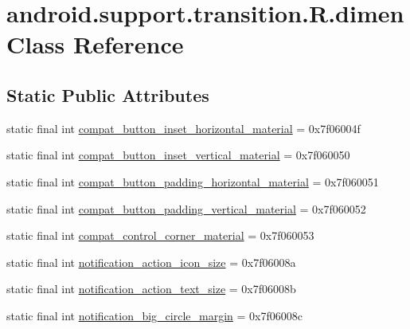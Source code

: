 \hypertarget{classandroid_1_1support_1_1transition_1_1R_1_1dimen}{}\section{android.\+support.\+transition.\+R.\+dimen Class Reference}
\label{classandroid_1_1support_1_1transition_1_1R_1_1dimen}
\subsection*{Static Public Attributes}
\begin{DoxyCompactItemize}
\item 
static final int \mbox{\hyperlink{classandroid_1_1support_1_1transition_1_1R_1_1dimen_ad48c30c57f147b3c4862710beca8e4da}{compat\+\_\+button\+\_\+inset\+\_\+horizontal\+\_\+material}} = 0x7f06004f
\item 
static final int \mbox{\hyperlink{classandroid_1_1support_1_1transition_1_1R_1_1dimen_a6df64291afb714b8eef79ccb2d3d903a}{compat\+\_\+button\+\_\+inset\+\_\+vertical\+\_\+material}} = 0x7f060050
\item 
static final int \mbox{\hyperlink{classandroid_1_1support_1_1transition_1_1R_1_1dimen_ac3103c3e23c6252fdf914a61c1bbb9a2}{compat\+\_\+button\+\_\+padding\+\_\+horizontal\+\_\+material}} = 0x7f060051
\item 
static final int \mbox{\hyperlink{classandroid_1_1support_1_1transition_1_1R_1_1dimen_a88db3cd5630edb0d3f334347d36e9eca}{compat\+\_\+button\+\_\+padding\+\_\+vertical\+\_\+material}} = 0x7f060052
\item 
static final int \mbox{\hyperlink{classandroid_1_1support_1_1transition_1_1R_1_1dimen_aa31fe95e8483316ad69395c3e5e15ed2}{compat\+\_\+control\+\_\+corner\+\_\+material}} = 0x7f060053
\item 
static final int \mbox{\hyperlink{classandroid_1_1support_1_1transition_1_1R_1_1dimen_aa2af3d20712209a6784f24bb01652ee9}{notification\+\_\+action\+\_\+icon\+\_\+size}} = 0x7f06008a
\item 
static final int \mbox{\hyperlink{classandroid_1_1support_1_1transition_1_1R_1_1dimen_aeea4229b64aeb5cafa0efaeb8a75ee88}{notification\+\_\+action\+\_\+text\+\_\+size}} = 0x7f06008b
\item 
static final int \mbox{\hyperlink{classandroid_1_1support_1_1transition_1_1R_1_1dimen_a680b4f6c05c80a1a09472747a9d11a34}{notification\+\_\+big\+\_\+circle\+\_\+margin}} = 0x7f06008c

\end{DoxyCompactItemize}
